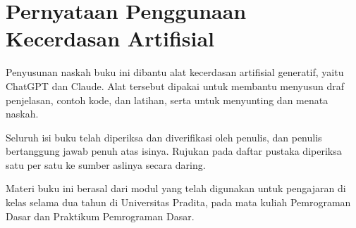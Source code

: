 \chapter{Pernyataan Penggunaan Kecerdasan Artifisial}

Penyusunan naskah buku ini dibantu alat kecerdasan artifisial generatif, yaitu ChatGPT dan Claude. Alat tersebut dipakai untuk membantu menyusun draf penjelasan, contoh kode, dan latihan, serta untuk menyunting dan menata naskah.

Seluruh isi buku telah diperiksa dan diverifikasi oleh penulis, dan penulis bertanggung jawab penuh atas isinya. Rujukan pada daftar pustaka diperiksa satu per satu ke sumber aslinya secara daring.

Materi buku ini berasal dari modul yang telah digunakan untuk pengajaran di kelas selama dua tahun di Universitas Pradita, pada mata kuliah Pemrograman Dasar dan Praktikum Pemrograman Dasar.
